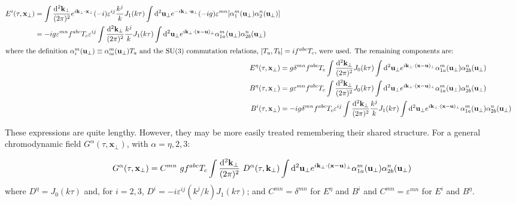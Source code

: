 \begin{subequations}
\label{eq:chromodynamic_fields_full}
\begin{align}
\begin{split}
	E^i (\tau,\mathbf{x}_\perp) & =  \int \frac{\diff^2 \mathbf{k}_\perp}{(2\pi)^2} e^{i \mathbf{k}_\perp \cdot \mathbf{x}_\perp} (-i)   \varepsilon^{i j} \frac{k^j}{k} J_1 (k \tau)  \int \diff^2 \mathbf{u}_\perp e^{-i \mathbf{k}_\perp \cdot \mathbf{u}_\perp} (-ig) \varepsilon^{mn} [\alpha^m_{1} (\mathbf{u}_\perp) \alpha^n_{2}(\mathbf{u}_\perp)] \\
	& = -ig \varepsilon^{mn} f^{abc} T_c \varepsilon^{ij} \int  \frac{\diff^2 \mathbf{k}_\perp}{(2\pi)^2} \frac{k^j}{k} J_1 (k \tau) \int \diff^2 \mathbf{u}_\perp e^{i \mathbf{k}_\perp \cdot (\mathbf{x} - \mathbf{u})_\perp} \alpha^m_{1a} (\mathbf{u}_\perp) \alpha^n_{2b}(\mathbf{u}_\perp)
\end{split} \\
\intertext{where the definition $\alpha_i^m(\mathbf{u}_\perp) \equiv \alpha_{ia}^m(\mathbf{u}_\perp) T_a$ and the SU(3) commutation relations, $[T_a,T_b] = if^{abc} T_c$, were used. The remaining components are:}
	E^\eta (\tau,\mathbf{x}_\perp) & = g \delta^{mn} f^{abc} T_c \int  \frac{\diff^2 \mathbf{k}_\perp}{(2\pi)^2} J_0 (k \tau) \int \diff^2 \mathbf{u}_\perp e^{i \mathbf{k}_\perp \cdot (\mathbf{x} - \mathbf{u})_\perp} \alpha^m_{1a} (\mathbf{u}_\perp) \alpha^n_{2b}(\mathbf{u}_\perp) \\
	B^\eta (\tau,\mathbf{x}_\perp) & = g \varepsilon^{mn} f^{abc} T_c \int  \frac{\diff^2 \mathbf{k}_\perp}{(2\pi)^2} J_0 (k \tau) \int \diff^2 \mathbf{u}_\perp e^{i \mathbf{k}_\perp \cdot (\mathbf{x} - \mathbf{u})_\perp} \alpha^m_{1a} (\mathbf{u}_\perp) \alpha^n_{2b}(\mathbf{u}_\perp) \\
	B^i (\tau,\mathbf{x}_\perp) & = -ig \delta^{mn} f^{abc} T_c \varepsilon^{i j} \int  \frac{\diff^2 \mathbf{k}_\perp}{(2\pi)^2} \frac{k^j}{k} J_1 (k \tau) \int \diff^2 \mathbf{u}_\perp e^{i \mathbf{k}_\perp \cdot (\mathbf{x} - \mathbf{u})_\perp} \alpha^m_{1a} (\mathbf{u}_\perp) \alpha^n_{2b}(\mathbf{u}_\perp)
\end{align}
\end{subequations}

These expressions are quite lengthy. However, they may be more easily treated remembering their shared  structure. For a general chromodynamic field $G^\alpha (\tau, \mathbf{x}_\perp)$, with $\alpha = \eta,2,3$:

\begin{equation}
\label{eq:shared_structure}
 G^\alpha (\tau, \mathbf{x}_\perp) = C^{mn} ~ g f^{abc} T_c \int  \frac{\mathop{}\!\mathrm{d}^2 \mathbf{k}_\perp}{(2\pi)^2} ~ D^\alpha (\tau, \mathbf{k}_\perp) \int \mathop{}\!\mathrm{d}^2 \mathbf{u}_\perp e^{i \mathbf{k}_\perp \cdot (\mathbf{x} - \mathbf{u})_\perp} \alpha^m_{1a} (\mathbf{u}_\perp) \alpha^n_{2b} (\mathbf{u}_\perp)
\end{equation}
where $D^\eta = J_0(k \tau)$  and, for $i=2,3$, $D^i = -i \varepsilon^{ij} (k^j/k) J_1(k \tau)$; and  $C^{mn} = \delta^{mn}$ for $E^\eta$ and $B^i$ and $C^{mn} = \varepsilon^{mn}$ for $E^i$ and $B^\eta$.



